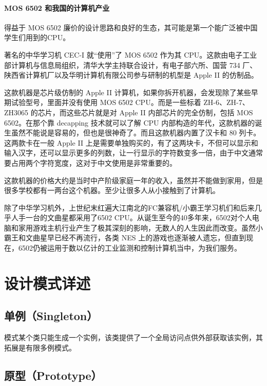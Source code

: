 \documentclass[cn,black,12pt,normal]{elegantnote}
\begin{document}
\paragraph{MOS 6502 和我国的计算机产业} 得益于 MOS 6502 廉价的设计思路和良好的生态，其可能是第一个能广泛被中国学生们用到的CPU。

著名的中华学习机 CEC-I 就“使用”了 MOS 6502 作为其 CPU。这款由电子工业部计算机与信息局组织，清华大学主持联合设计，有电子部六所、国营 734 厂、陕西省计算机厂以及华明计算机有限公司参与研制的机型是 Apple II 的仿制品。

这款机器是芯片级仿制的 Apple II 计算机，如果你拆开机器，会发现除了某些早期试验型号，里面并没有使用 MOS 6502 CPU。而是一些标着 ZH-6、ZH-7、ZH3065 的芯片，而这些芯片就是对 Apple II 内部芯片的完全仿制，包括 MOS 6502。在那个靠 decapping 技术就可以了解 CPU 内部构造的年代，这款机器的诞生虽然不能说是容易的，但也是很神奇了。而且这款机器内置了汉卡和 80 列卡。这两款卡在一般 Apple II 上是需要单独购买的，有了这两块卡，不但可以显示和输入汉字，还可以显示更多的列数，让一行显示的字符数变多一倍，由于中文通常要占用两个字符宽度，这对于中文使用是非常重要的。

这款机器的价格大约是当时中产阶级家庭一年的收入，虽然并不能做到家用，但是很多学校都有一两台这个机器。至少让很多人从小接触到了计算机。

除了中华学习机外，上世纪末红遍大江南北的FC兼容机/小霸王学习机们和后来几乎人手一台的文曲星都采用了6502 CPU。从诞生至今的40多年来，6502对个人电脑和家用游戏主机行业产生了极其深刻的影响，无数人的人生因此而改变。虽然小霸王和文曲星早已经不再流行，各类 NES 上的游戏也逐渐被人遗忘，但直到现在，6502仍被运用于数以亿计的工业监测和控制计算机当中，为我们服务。

\newpage

\section{设计模式详述}

\subsection{单例（Singleton）}

模式某个类只能生成一个实例，该类提供了一个全局访问点供外部获取该实例，其拓展是有限多例模式。

\subsection{原型（Prototype）}
\end{document}
